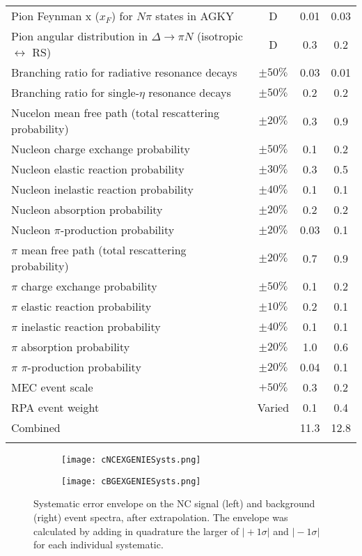 \begin{doublespace}
\begin{longtable}{p{3.5in} c c c}
  Pion Feynman x ($x_F$) for $N\pi$ states in AGKY & D & 0.01 & 0.03 \\
  Pion angular distribution in $\Delta \rightarrow \pi N$ \newline (isotropic $\leftrightarrow$ RS) & D & 0.3 & 0.2 \\
  Branching ratio for radiative resonance decays & $\pm50\%$ & 0.03 & 0.01 \\
  Branching ratio for single-$\eta$ resonance decays & $\pm50\%$ & 0.2 & 0.2 \\
  Nucelon mean free path (total rescattering \newline probability) & $\pm20\%$ & 0.3 & 0.9 \\
  Nucleon charge exchange probability & $\pm50\%$ & 0.1 & 0.2 \\
  Nucleon elastic reaction probability & $\pm30\%$ & 0.3 & 0.5 \\
  Nucleon inelastic reaction probability & $\pm40\%$ & 0.1 & 0.1 \\
  Nucleon absorption probability & $\pm20\%$ & 0.2 & 0.2 \\
  Nucleon $\pi$-production probability & $\pm20\%$ & 0.03 & 0.1 \\
  $\pi$ mean free path (total rescattering probability) & $\pm20\%$ & 0.7 & 0.9 \\
  $\pi$ charge exchange probability & $\pm50\%$ & 0.1 & 0.2 \\
  $\pi$ elastic reaction probability & $\pm10\%$ & 0.2 & 0.1 \\
  $\pi$ inelastic reaction probability & $\pm40\%$ & 0.1 & 0.1 \\
  $\pi$ absorption probability & $\pm20\%$ & 1.0 & 0.6 \\
  $\pi$ $\pi$-production probability & $\pm20\%$ & 0.04 & 0.1 \\
  MEC event scale & $+50\%$ & 0.3 & 0.2 \\
  RPA event weight & Varied & 0.1 & 0.4 \\
  \hline
  Combined & & 11.3 & 12.8 \\
  \hline
  \label{tab:SystGENIE}
\end{longtable}
\doublespacing

\begin{figure}[h]
  \centering
  \begin{subfigure}{.48\textwidth}
    \centering
    \texttt{[image: cNCEXGENIESysts.png]}
  \end{subfigure}
  \begin{subfigure}{.48\textwidth}
    \centering
    \texttt{[image: cBGEXGENIESysts.png]}
  \end{subfigure}
  \caption[GENIE Systematic Error Envelopes]{Systematic error envelope on the NC signal (left) and background (right) event spectra, after extrapolation. The envelope was calculated by adding in quadrature the larger of $\vert +1\sigma \vert$ and $\vert -1\sigma \vert$ for each individual systematic.}
  \label{fig:SystGENIE}
\end{figure}


\end{doublespace}
